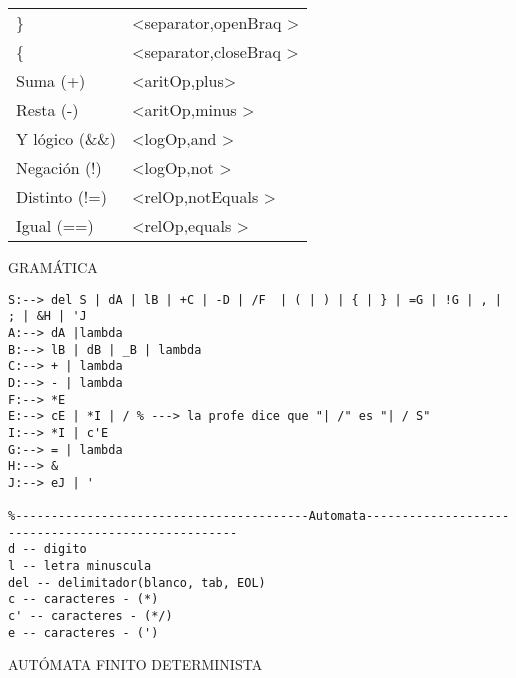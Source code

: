 \documentclass{article}
\begin{document}
{{\begin{tabular}{l|l}
       	\}                  &\textless  separator,openBraq \textgreater\\
        \{\                  &\textless separator,closeBraq \textgreater\\
        Suma (+)	        &\textless aritOp,plus\textgreater\\
        Resta (-)	        &\textless aritOp,minus \textgreater\\
        Y lógico (\&\&)	    &\textless logOp,and \textgreater\\
        Negación (!)	    &\textless logOp,not \textgreater\\
        Distinto (!=)	    &\textless relOp,notEquals \textgreater\\
        Igual (==)	        &\textless relOp,equals \textgreater
        
    \end{tabular}
  }
}

\newpage
\begin{center}
    GRAMÁTICA
\end{center}
\begin{verbatim}
S:--> del S | dA | lB | +C | -D | /F  | ( | ) | { | } | =G | !G | , | ; | &H | 'J
A:--> dA |lambda
B:--> lB | dB | _B | lambda  
C:--> + | lambda
D:--> - | lambda
F:--> *E
E:--> cE | *I | / % ---> la profe dice que "| /" es "| / S"
I:--> *I | c'E
G:--> = | lambda
H:--> &
J:--> eJ | '

%-----------------------------------------Automata----------------------------------------------------
d -- digito
l -- letra minuscula
del -- delimitador(blanco, tab, EOL)
c -- caracteres - (*)
c' -- caracteres - (*/)
e -- caracteres - (')
\end{verbatim}
\newpage
\begin{center}
AUTÓMATA FINITO DETERMINISTA
\end{center}

\vspace*{1cm}
\end{document}
